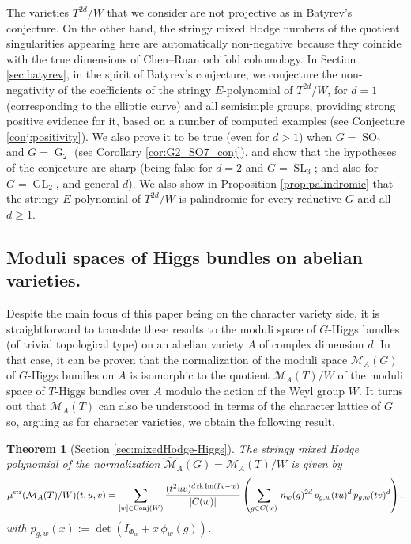 \documentclass[11pt,english]{amsart}
\numberwithin{equation}{section}
\numberwithin{figure}{section}
\theoremstyle{plain}
\newtheorem{theintro}{Theorem}
\theoremstyle{plain}
\theoremstyle{definition}
\theoremstyle{remark}
\DeclareMathOperator{\image}{Im}
\newcommand{\rk}{\operatorname{rk}}
\newcommand{\GL}{\operatorname{GL}}
\newcommand{\SL}{\operatorname{SL}}
\newcommand{\SO}{\operatorname{SO}}
\newcommand{\G}{\operatorname{G}}
\newcommand{\str}{\textup{str}}
\begin{document}
The varieties $T^{2d}/W$ that we consider are not projective as in Batyrev's conjecture. On the other hand, the stringy mixed Hodge numbers of the quotient singularities appearing here are automatically non-negative because they coincide with the true dimensions of Chen--Ruan orbifold cohomology.
In Section \ref{sec:batyrev}, in the spirit of Batyrev's conjecture, we conjecture the non-negativity of the coefficients of the stringy $E$-polynomial of $T^{2d}/W$, for $d=1$ (corresponding to the elliptic curve) and all semisimple groups, providing strong positive evidence for it, based on a number of computed examples (see Conjecture \ref{conj:positivity}). We also prove it to be true (even for $d>1$) when $G=\SO_7$ and $G=\G_2$ (see Corollary \ref{cor:G2_SO7_conj}), and show that the hypotheses of the conjecture are sharp (being false for $d=2$ and $G=\SL_3$; and also for $G = \GL_2$, and general $d$). We also show in Proposition \ref{prop:palindromic} that the stringy $E$-polynomial of $T^{2d}/W$ is palindromic for every reductive $G$ and all $d\geq 1$.

\subsection*{Moduli spaces of Higgs bundles on abelian varieties.} Despite the main focus of this paper being on the character variety side, it is straightforward to translate these results to the moduli space of $G$-Higgs bundles (of trivial topological type) on an abelian variety $A$ of complex dimension $d$. In that case, it can be proven that the normalization of the moduli space $\mathcal{M}_A(G)$ of $G$-Higgs bundles on $A$ is isomorphic to the quotient $\mathcal{M}_A(T) / W$ of the moduli space of $T$-Higgs bundles over $A$ modulo the action of the Weyl group $W$. It turns out that $\mathcal{M}_A(T)$ can also be understood in terms of the character lattice of $G$ so, arguing as for character varieties, we obtain the following result.

\begin{theintro}[Section \ref{sec:mixedHodge-Higgs}]\label{thm:algorithm_Higgs-intro}
    The stringy mixed Hodge polynomial of the normalization $\hat{\mathcal{M}}_A(G) = \mathcal{M}_A(T) / W$ is given by
\[
        \mu^{\str} (\mathcal{M}_A(T) / W)(t,u,v) 
        =\sum_{[w] \in \textup{Conj}(W)}
        \frac{(t^{2}uv)^{d\rk \image(I_\Lambda -w)}}{|C(w)|}\left(\sum_{g \in C(w)} \, n_{w}(g)^{2d}\, p_{g,w}(tu)^d\, p_{g,w}(tv)^d \right),
\]
with $p_{g,w}(x):=\det (I_{\Phi_w} + x\,\phi_w(g))$.
\end{theintro}
\end{document}

